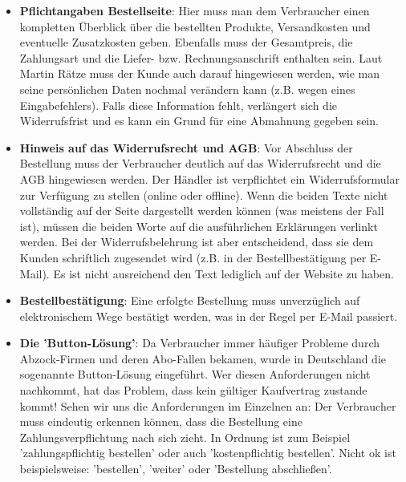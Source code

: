 \documentclass[a4paper]{article}
\begin{document}
\begin{itemize}
\item \textbf{Pflichtangaben Bestellseite}: Hier muss man dem Verbraucher einen kompletten Überblick über die bestellten Produkte, Versandkosten und eventuelle Zusatzkosten geben. Ebenfalls muss der Gesamtpreis, die Zahlungsart und die Liefer- bzw. Rechnungsanschrift enthalten sein. Laut Martin Rätze muss der Kunde auch darauf hingewiesen werden, wie man seine persönlichen Daten nochmal verändern kann (z.B. wegen eines Eingabefehlers). Falls diese Information fehlt, verlängert sich die Widerrufsfrist und es kann ein Grund für eine Abmahnung gegeben sein.

\item \textbf{Hinweis auf das Widerrufsrecht und AGB}: Vor Abschluss der Bestellung muss der Verbraucher deutlich auf das Widerrufsrecht und die AGB hingewiesen werden. Der Händler ist verpflichtet ein Widerrufsformular zur Verfügung zu stellen (online oder offline). Wenn die beiden Texte nicht vollständig auf der Seite dargestellt werden können (was meistens der Fall ist), müssen die beiden Worte auf die ausführlichen Erklärungen verlinkt werden. Bei der Widerrufsbelehrung ist aber entscheidend, dass sie dem Kunden schriftlich zugesendet wird (z.B. in der Bestellbestätigung per E-Mail). Es ist nicht ausreichend den Text lediglich auf der Website zu haben.

\item \textbf{Bestellbestätigung}: Eine erfolgte Bestellung muss unverzüglich auf elektronischem Wege bestätigt werden, was in der Regel per E-Mail passiert.

\item \textbf{Die 'Button-Lösung'}: Da Verbraucher immer häufiger Probleme durch Abzock-Firmen und deren Abo-Fallen bekamen, wurde in Deutschland die sogenannte Button-Lösung eingeführt. Wer diesen Anforderungen nicht nachkommt, hat das Problem, dass kein gültiger Kaufvertrag zustande kommt! Sehen wir uns die Anforderungen im Einzelnen an: Der Verbraucher muss eindeutig erkennen können, dass die Bestellung eine Zahlungsverpflichtung nach sich zieht. In Ordnung ist zum Beispiel 'zahlungspflichtig bestellen' oder auch 'kostenpflichtig bestellen'. Nicht ok ist beispielsweise: 'bestellen', 'weiter' oder 'Bestellung abschließen'.

\end{itemize}
\end{document}
